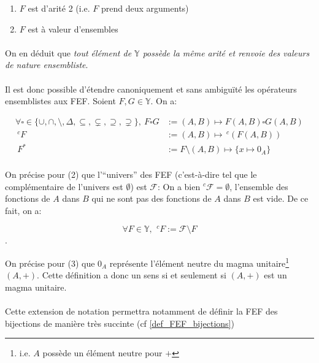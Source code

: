 \documentclass{article}
\newcommand{\Y}{{\mathbb Y}}
\newcommand{\cF}{{\mathcal F}}
\begin{document}
\begin{enumerate}
	\item $F$ est d'arité 2 (i.e. $F$ prend deux arguments)
	\item $F$ est à valeur d'ensembles
\end{enumerate}

\paragraph{}
On en déduit que \emph{tout élément de $\Y$ possède la même arité et renvoie des valeurs de nature ensembliste}.

\paragraph{}
Il est donc possible d'étendre canoniquement et sans ambiguïté les opérateurs ensemblistes aux FEF. Soient $F, G \in \Y$. On a:

\begin{align}
	\forall \square \in \{\cup, \cap, \setminus, \Delta, \subseteq, \subsetneq, \supseteq, \supsetneq \},\ F \square G &:= (A, B)\mapsto F(A, B) \square G(A, B) \\
    \ ^c\!F &:= (A, B)\mapsto \,^c\!(F(A,B)) \\
	\ F^\ast &:= F \setminus (A, B)\mapsto \{x\mapsto 0_A\} 
\end{align}

\paragraph{}
On précise pour (2) que l'“univers” des FEF (c'est-à-dire tel que le complémentaire de l'univers est $\emptyset$) est $\cF$: On a bien $^c\!\cF = \emptyset$, l'ensemble des fonctions de $A$ dans $B$ qui ne sont pas des fonctions de $A$ dans $B$ est vide. De ce fait, on a:

\[
	\forall F\in \Y,\ \,^c\!F := \cF \setminus F
\]. 

On précise pour (3) que $0_A$ représente l'élément neutre du magma unitaire\footnote{i.e. $A$ possède un élément neutre pour $+$} $(A, +)$. Cette définition a donc un sens si et seulement si $(A, +)$ est un magma unitaire.

\paragraph{}
Cette extension de notation permettra notamment de définir la FEF des bijections de manière très succinte (cf \ref{def_FEF_bijections})
\end{document}
